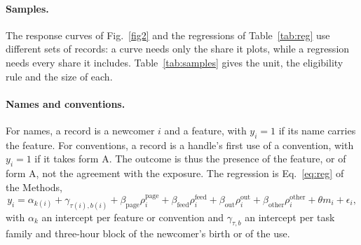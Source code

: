 \documentclass[10pt]{article}
\begin{document}
\paragraph{Samples.} The response curves of Fig.~\ref{fig2} and the regressions of Table~\ref{tab:reg} use different sets of records: a curve needs only the share it plots, while a regression needs every share it includes. Table~\ref{tab:samples} gives the unit, the eligibility rule and the size of each.

\begin{table}[htbp]\centering\small
\caption{\textbf{The samples of the record analyses.} For each response curve of Fig.~\ref{fig2} and each panel of Table~\ref{tab:reg}: the unit of observation, when a unit enters, and the number of units.}\label{tab:samples}

\end{table}

\paragraph{Names and conventions.} For names, a record is a newcomer $i$ and a feature, with $y_i=1$ if its name carries the feature. For conventions, a record is a handle's first use of a convention, with $y_i=1$ if it takes form A. The outcome is thus the presence of the feature, or of form A, not the agreement with the exposure. The regression is Eq.~\eqref{eq:reg} of the Methods,
\[
y_i=\alpha_{k(i)}+\gamma_{\tau(i),b(i)}+\beta_{\mathrm{page}}\rho_i^{\mathrm{page}}+\beta_{\mathrm{feed}}\rho_i^{\mathrm{feed}}+\beta_{\mathrm{out}}\rho_i^{\mathrm{out}}+\beta_{\mathrm{other}}\rho_i^{\mathrm{other}}+\theta m_i+\epsilon_i,
\]
with $\alpha_k$ an intercept per feature or convention and $\gamma_{\tau,b}$ an intercept per task family and three-hour block of the newcomer's birth or of the use.
\end{document}
